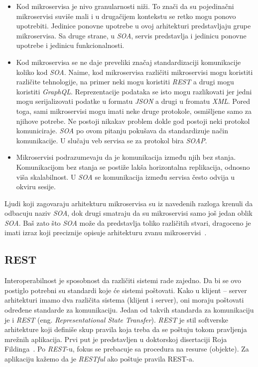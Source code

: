 \begin{itemize}
    \item Kod mikroservisa je nivo granularnosti niži. To znači da su pojedinačni mikroservisi suviše mali i u drugačijem 
    kontekstu se retko mogu ponovo upotrebiti. Jedinice ponovne upotrebe u ovoj arhitekturi predstavljaju grupe mikroservisa.
    Sa druge strane, u \textit{SOA}, servis predstavlja i jedinicu ponovne upotrebe i jedinicu funkcionalnosti.
    \item Kod mikroservisa se ne daje preveliki značaj standardizaciji komunikacije koliko kod \textit{SOA}. Naime, kod mikroservisa
    različiti mikroservisi mogu koristiti različite tehnologije, na primer neki mogu koristiti \textit{REST} a drugi mogu koristiti \textit{GraphQL}.
    Reprezentacije podataka se isto mogu razlikovati jer jedni mogu serijalizovati podatke u formatu \textit{JSON} a drugi u fromatu \textit{XML}.
    Pored toga, sami mikroservisi mogu imati neke druge protokole, osmišljene samo za njihove potrebe. Ne postoji nikakav problem dokle god postoji neki 
    protokol komuniciraje. \textit{SOA} po ovom pitanju pokušava da standardizuje način komunikacije. U slučaju veb servisa se za protokol bira \textit{SOAP}.
    \item Mikroservisi podrazumevaju da je komunikacija između njih bez stanja. Komunikacijom bez stanja se postiže lakša horizontalna replikacija, odnosno 
    viša skalabilnost. U \textit{SOA} se komunikacija između servisa često odvija u okviru sesije.
\end{itemize}		

Ljudi koji zagovaraju arhitekturu mikroservisa su iz navedenih razloga krenuli da odbacuju naziv \textit{SOA}, 
dok drugi smatraju da su mikroservisi samo još jedan oblik \textit{SOA}. Baš zato što \textit{SOA} 
može da predstavlja toliko različitih stvari, dragoceno je imati izraz koji preciznije opisuje arhitekturu 
zvanu mikroservisi~\cite{martinfowler_microservices}.

\subsection{REST}\label{sec:arhitektura-rest}

Interoperabilnost je sposobnost da različiti sistemi rade zajedno. Da bi se ovo postiglo potrebni su 
standardi koje će sistemi poštovati. Kako u klijent -- server arhitekturi imamo dva različita sistema 
(klijent i server), oni moraju poštovati određene standarde za komunikaciju. Jedan od takvih standarda za 
komunikaciju je i \textit{REST} (eng. \textit{Representational State Transfer}). \textit{REST} je stil 
softverske arhitekture koji definiše skup pravila koja treba da se poštuju tokom pravljenja mrežnih 
aplikacija. Prvi put je predstavljen u doktorskoj disertaciji Roja Fildinga~\cite{REST_Roy}. Po \textit{REST}-u, 
fokus se prebacuje sa procedura na resurse (objekte). Za aplikaciju kažemo da je \textit{RESTful} ako poštuje pravila REST-a.


